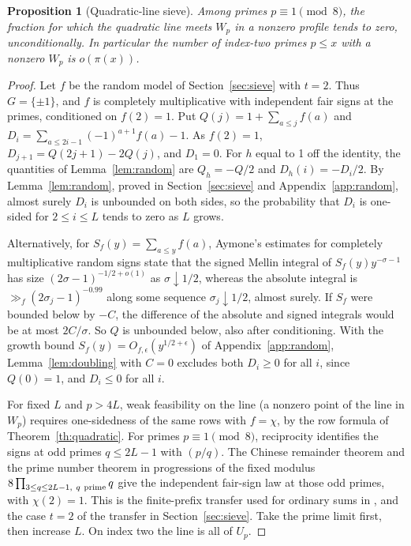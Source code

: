 \documentclass[11pt,reqno]{amsart}
\newtheorem{proposition}[theorem]{Proposition}
\begin{document}
\begin{proposition}[Quadratic-line sieve]\label{prop:quadratic}
Among primes \(p\equiv1\pmod8\), the fraction for which the quadratic line meets \(W_p\) in a nonzero profile tends to zero, unconditionally. In particular the number of index-two primes \(p\le x\) with a nonzero \(W_p\) is \(o(\pi(x))\).
\end{proposition}
\begin{proof}
Let \(f\) be the random model of Section~\ref{sec:sieve} with \(t=2\). Thus \(G=\{\pm1\}\), and \(f\) is completely multiplicative with independent fair signs at the primes, conditioned on \(f(2)=1\). Put \(Q(j)=1+\sum_{a\le j}f(a)\) and \(D_i=\sum_{a\le2i-1}(-1)^{a+1}f(a)-1\). As \(f(2)=1\), \(D_{j+1}=Q(2j+1)-2Q(j)\), and \(D_1=0\). For \(h\) equal to 1 off the identity, the quantities of Lemma~\ref{lem:random} are \(Q_h=-Q/2\) and \(D_h(i)=-D_i/2\). By Lemma~\ref{lem:random}, proved in Section~\ref{sec:sieve} and Appendix~\ref{app:random}, almost surely \(D_i\) is unbounded on both sides, so the probability that \(D_i\) is one-sided for \(2\le i\le L\) tends to zero as \(L\) grows.

Alternatively, for \(S_f(y)=\sum_{a\le y}f(a)\), Aymone's estimates for completely multiplicative random signs \cite[\S3.2, (5)--(6) at \(\alpha=0\)]{Aymone} state that the signed Mellin integral of \(S_f(y)y^{-\sigma-1}\) has size \((2\sigma-1)^{-1/2+o(1)}\) as \(\sigma\downarrow1/2\), whereas the absolute integral is \(\gg_f(2\sigma_j-1)^{-0.99}\) along some sequence \(\sigma_j\downarrow1/2\), almost surely. If \(S_f\) were bounded below by \(-C\), the difference of the absolute and signed integrals would be at most \(2C/\sigma\). So \(Q\) is unbounded below, also after conditioning. With the growth bound \(S_f(y)=O_{f,\epsilon}(y^{1/2+\epsilon})\) of Appendix~\ref{app:random}, Lemma~\ref{lem:doubling} with \(C=0\) excludes both \(D_i\ge0\) for all \(i\), since \(Q(0)=1\), and \(D_i\le0\) for all \(i\).

For fixed \(L\) and \(p>4L\), weak feasibility on the line (a nonzero point of the line in \(W_p\)) requires one-sidedness of the same rows with \(f=\chi\), by the row formula of Theorem~\ref{th:quadratic}. For primes \(p\equiv1\pmod8\), reciprocity identifies the signs at odd primes \(q\le 2L-1\) with \((p/q)\). The Chinese remainder theorem and the prime number theorem in progressions of the fixed modulus \(8\prod_{3\le q\le2L-1,\ q\ {\rm prime}}q\) give the independent fair-sign law at those odd primes, with \(\chi(2)=1\). This is the finite-prefix transfer used for ordinary sums in \cite[Theorems~2--3]{Kal}, and the case \(t=2\) of the transfer in Section~\ref{sec:sieve}. Take the prime limit first, then increase \(L\). On index two the line is all of \(U_p\).
\end{proof}
\end{document}
